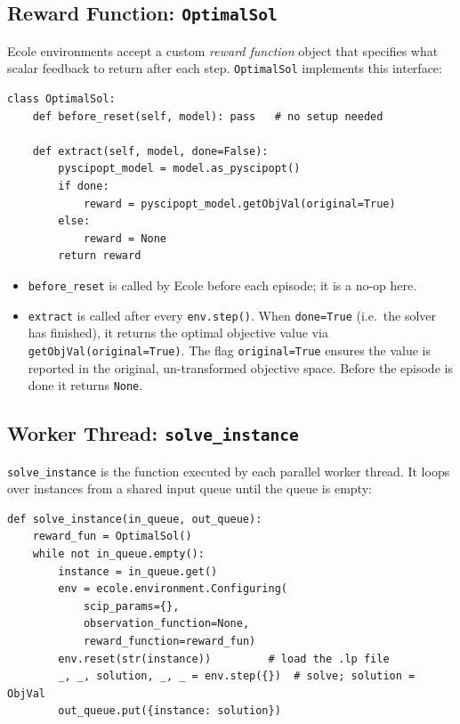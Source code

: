 \subsection{Reward Function: \texttt{OptimalSol}}

Ecole environments accept a custom \emph{reward function} object that specifies what scalar feedback to return after each step. \texttt{OptimalSol} implements this interface:

\begin{lstlisting}
class OptimalSol:
    def before_reset(self, model): pass   # no setup needed

    def extract(self, model, done=False):
        pyscipopt_model = model.as_pyscipopt()
        if done:
            reward = pyscipopt_model.getObjVal(original=True)
        else:
            reward = None
        return reward
\end{lstlisting}

\begin{itemize}
    \item \texttt{before\_reset} is called by Ecole before each episode; it is a no-op here.
    \item \texttt{extract} is called after every \texttt{env.step()}. When \texttt{done=True} (i.e.\ the solver has finished), it returns the optimal objective value via \texttt{getObjVal(original=True)}. The flag \texttt{original=True} ensures the value is reported in the original, un-transformed objective space. Before the episode is done it returns \texttt{None}.
\end{itemize}

\subsection{Worker Thread: \texttt{solve\_instance}}

\texttt{solve\_instance} is the function executed by each parallel worker thread. It loops over instances from a shared input queue until the queue is empty:

\begin{lstlisting}
def solve_instance(in_queue, out_queue):
    reward_fun = OptimalSol()
    while not in_queue.empty():
        instance = in_queue.get()
        env = ecole.environment.Configuring(
            scip_params={},
            observation_function=None,
            reward_function=reward_fun)
        env.reset(str(instance))         # load the .lp file
        _, _, solution, _, _ = env.step({})  # solve; solution = ObjVal
        out_queue.put({instance: solution})
\end{lstlisting}

